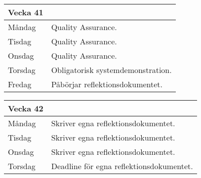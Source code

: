 \documentclass{TDP003mall}
\begin{document}
\begin{table}[!h]
    \begin{tabularx}{\textwidth}{l|l}
        Vecka 41\\\hline
        Måndag  & Quality Assurance.\\ %
        Tisdag  & Quality Assurance.\\
        Onsdag  & Quality Assurance.\\
        Torsdag & Obligatorisk systemdemonstration.\\ %
        Fredag  & Påbörjar reflektionsdokumentet.\\ %
    \end{tabularx}
\end{table}

\begin{table}[!h]
    \begin{tabularx}{\textwidth}{l|l}
        Vecka 42\\\hline
        Måndag  & Skriver egna reflektionsdokumentet.\\ %
        Tisdag  & Skriver egna reflektionsdokumentet.\\ %
        Onsdag  & Skriver egna reflektionsdokumentet.\\ %
        Torsdag & Deadline för egna reflektionsdokumentet.\\ %
    \end{tabularx}
\end{table}
\end{document}
